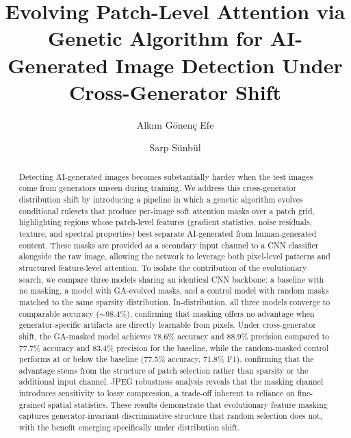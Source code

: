 \documentclass[runningheads]{llncs}
\begin{document}
\title{Evolving Patch-Level Attention via Genetic Algorithm for AI-Generated Image Detection Under Cross-Generator Shift}


\author{Alk{\i}m G\"onen\c{c} Efe \and Sarp S\"unb\"ul}



\maketitle

\begin{abstract}
Detecting AI-generated images becomes substantially harder when the test images come from generators unseen during training. We address this cross-generator distribution shift by introducing a pipeline in which a genetic algorithm evolves conditional rulesets that produce per-image soft attention masks over a patch grid, highlighting regions whose patch-level features (gradient statistics, noise residuals, texture, and spectral properties) best separate AI-generated from human-generated content. These masks are provided as a secondary input channel to a CNN classifier alongside the raw image, allowing the network to leverage both pixel-level patterns and structured feature-level attention. To isolate the contribution of the evolutionary search, we compare three models sharing an identical CNN backbone: a baseline with no masking, a model with GA-evolved masks, and a control model with random masks matched to the same sparsity distribution. In-distribution, all three models converge to comparable accuracy ($\sim$98.4\%), confirming that masking offers no advantage when generator-specific artifacts are directly learnable from pixels. Under cross-generator shift, the GA-masked model achieves 78.6\% accuracy and 88.9\% precision compared to 77.7\% accuracy and 83.4\% precision for the baseline, while the random-masked control performs at or below the baseline (77.5\% accuracy, 71.8\% F1), confirming that the advantage stems from the structure of patch selection rather than sparsity or the additional input channel. JPEG robustness analysis reveals that the masking channel introduces sensitivity to lossy compression, a trade-off inherent to reliance on fine-grained spatial statistics. These results demonstrate that evolutionary feature masking captures generator-invariant discriminative structure that random selection does not, with the benefit emerging specifically under distribution shift.

\end{abstract}
\end{document}
